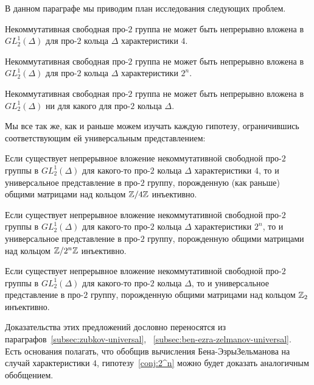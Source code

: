 В данном параграфе мы приводим план исследования следующих проблем.

\begin{conjecture}
    \label{conj:4}
    Некоммутативная свободная про-$2$ группа не может быть непрерывно вложена в $GL^1_2(\Delta)$ для про-$2$ кольца $\Delta$ характеристики $4$.
\end{conjecture}
\begin{conjecture}
    \label{conj:2^n}
    Некоммутативная свободная про-$2$ группа не может быть непрерывно вложена в $GL^1_2(\Delta)$ для про-$2$ кольца $\Delta$ характеристики $2^n$.
\end{conjecture}
\begin{conjecture}
    \label{conj:2_n}
    Некоммутативная свободная про-$2$ группа не может быть непрерывно вложена в $GL^1_2(\Delta)$ ни для какого для про-$2$ кольца $\Delta$.
\end{conjecture}
\vskip 0.1in\noindent

Мы все так же, как и раньше можем изучать каждую гипотезу, ограничившись соответствующим ей универсальным представлением:

\vskip 0.1in\noindent
\begin{proposition}
    Если существует непрерывное вложение некоммутативной свободной про-$2$ группы в $GL_2^1(\Delta)$ для какого-то про-$2$ кольца $\Delta$ характеристики $4$, то и универсальное представление в про-$2$ группу, порожденную (как раньше) общими матрицами над кольцом $\mathbb{Z}/4\mathbb{Z}$ инъективно.
\end{proposition}
\begin{proposition}
    Если существует непрерывное вложение некоммутативной свободной про-$2$ группы в $GL_2^1(\Delta)$ для какого-то про-$2$ кольца $\Delta$ характеристики $2^n$, то и универсальное представление в про-$2$ группу, порожденную общими матрицами над кольцом $\mathbb{Z}/2^n\mathbb{Z}$ инъективно.
\end{proposition}
\begin{proposition}
    Если существует непрерывное вложение некоммутативной свободной про-$2$ группы в $GL_2^1(\Delta)$ для какого-то про-$2$ кольца $\Delta$, то и универсальное представление в про-$2$ группу, порожденную общими матрицами над кольцом $\mathbb{Z}_2$ инъективно.
\end{proposition}
\vskip 0.1in\noindent

Доказательства этих предложений дословно переносятся из параграфов~\ref{subsec:zubkov-universal}, ~\ref{subsec:ben-ezra-zelmanov-universal}.\\
Есть основания полагать, что обобщив вычисления Бена-Эзры\textemdash Зельманова на случай характеристики $4$, гипотезу~\ref{conj:2^n} можно будет доказать аналогичным обобщением.

